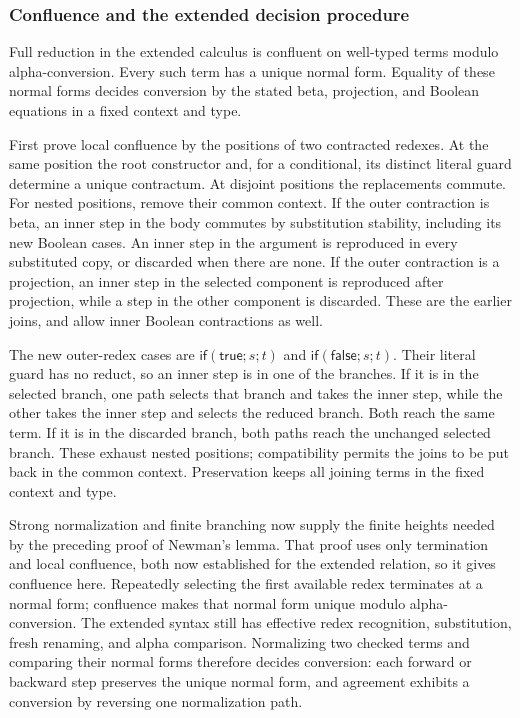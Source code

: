 \subsubsection{Confluence and the extended decision procedure}
\begin{theorem}
\label{thm:boolean_confluence}
Full reduction in the extended calculus is confluent on well-typed
terms modulo alpha-conversion. Every such term has a unique normal
form. Equality of these normal forms decides conversion by the stated
beta, projection, and Boolean equations in a fixed context and type.
\end{theorem}
\Proof
First prove local confluence by the positions of two contracted redexes.
At the same position the root constructor and, for a conditional,
its distinct literal guard determine a unique contractum. At disjoint
positions the replacements commute. For nested positions, remove their
common context. If the outer contraction is beta, an inner step in
the body commutes by substitution stability, including its new Boolean
cases. An inner step in the argument is reproduced in every substituted
copy, or discarded when there are none. If the outer contraction is a
projection, an inner step in the selected component is reproduced after
projection, while a step in the other component is discarded. These
are the earlier joins, and allow inner Boolean contractions as well.

The new outer-redex cases are
$\mathsf{if}(\mathsf{true};s;t)$ and
$\mathsf{if}(\mathsf{false};s;t)$. Their literal guard has no reduct,
so an inner step is in one of the branches. If it is in the selected
branch, one path selects that branch and takes the inner step, while
the other takes the inner step and selects the reduced branch. Both
reach the same term. If it is in the discarded branch, both paths
reach the unchanged selected branch. These exhaust nested positions;
compatibility permits the joins to be put back in the common context.
Preservation keeps all joining terms in the fixed context and type.

Strong normalization and finite branching now supply the finite heights
needed by the preceding proof of Newman's lemma. That proof uses only
termination and local confluence, both now established for the extended
relation, so it gives confluence here. Repeatedly selecting the first
available redex terminates at a normal form; confluence makes that
normal form unique modulo alpha-conversion. The extended syntax still
has effective redex recognition, substitution, fresh renaming, and
alpha comparison. Normalizing two checked terms and comparing their
normal forms therefore decides conversion: each forward or backward
step preserves the unique normal form, and agreement exhibits a
conversion by reversing one normalization path.
\Done

